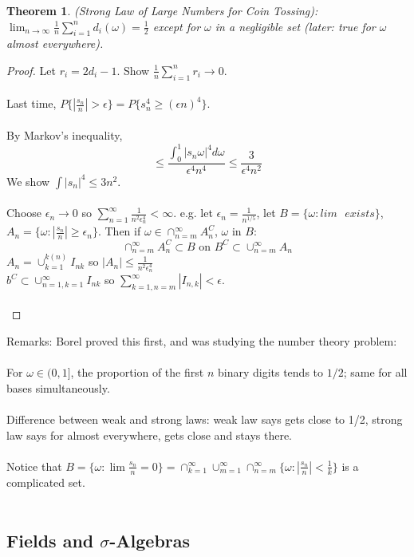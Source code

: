 \documentclass[12pt]{article}
\newtheorem{theorem}{Theorem}
\begin{document}
\begin{theorem}
(Strong Law of Large Numbers for Coin Tossing): $\lim_{n \to \infty} \frac{1}{n} \sum_{i=1}^n d_i(\omega) = \frac{1}{2}$ except for $\omega$ in a negligible set (later: true for $\omega$ almost everywhere).
\end{theorem}
\begin{proof}
Let $r_i = 2d_i - 1$.  Show $\frac{1}{n} \sum_{i=1}^n r_i \rightarrow 0$.
\\ \\
Last time, $P\{ | \frac{s_n}{n} | > \epsilon \} = P \{ s_n^4 \ge (\epsilon n)^4 \}$.
\\ \\
By Markov's inequality,
$$\le \frac{ \int_0^1 |s_n \omega|^4 d \omega }{\epsilon^4 n^4} \le \frac{3}{\epsilon^4 n^2}$$
We show $\int |s_n|^4 \le 3n^2$.
\\ \\
Choose $\epsilon_n \to 0$ so $\sum_{n=1}^\infty \frac{1}{n^2 \epsilon_n^4} < \infty$.
e.g. let $\epsilon_n = \frac{1}{n^{1/5}}$, let $B = \{ \omega: lim \textrm{ } exists \}$, $A_n = \{ \omega: | \frac{s_n}{n} | \ge \epsilon_n \}$.
Then if $\omega \in \cap_{n=m}^\infty A_n^C$, $\omega$ in $B$:
$$\cap_{n=m}^\infty A_n^C \subset B \textrm{ on } B^C \subset \cup_{n=m}^\infty A_n$$
$A_n = \cup_{k=1}^{k(n)} I_{nk}$ so $|A_n| \le \frac{1}{n^2 \epsilon_n^4}$\\
$b^C \subset \cup_{n=1, k=1}^\infty I_{nk}$ so $\sum_{k=1, n=m}^\infty |I_{n,k}| < \epsilon$.
\\ \\
\end{proof}
Remarks: Borel proved this first, and was studying the number theory problem:\\ \\
For $\omega \in (0, 1]$, the proportion of the first $n$ binary digits tends to $1/2$; same for all bases simultaneously.
\\ \\
Difference between weak and strong laws: weak law says gets close to 1/2, strong law says for almost everywhere, gets close and stays there.
\\ \\
Notice that $B = \{ \omega : \lim \frac{s_n}{n} = 0 \} = \cap_{k=1}^\infty \cup_{m=1}^\infty \cap_{n=m}^\infty \{ \omega: |\frac{s_n}{n} | < \frac{1}{k} \}$ is a complicated set.
\\ \\
\subsection{Fields and $\sigma$-Algebras}
\end{document}
